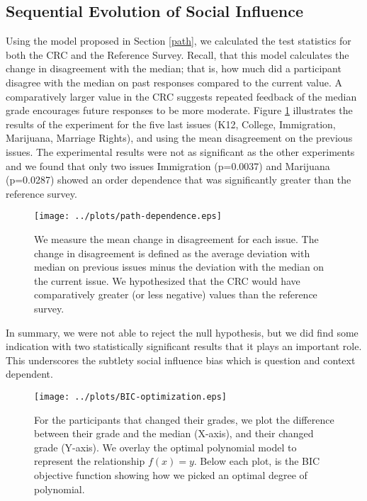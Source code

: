 \subsection{Sequential Evolution of Social Influence}
Using the model proposed in Section \ref{path}, we calculated the test statistics for both the CRC and the Reference Survey.
Recall, that this model calculates the change in disagreement with the median; that is, how much did a participant disagree with the median on past responses compared 
to the current value.
A comparatively larger value in the CRC suggests repeated feedback of the median grade encourages future responses to be more moderate.
Figure \ref{path-1} illustrates the results of the experiment for the five last issues (K12, College, Immigration, Marijuana, Marriage Rights), and using the mean disagreement on the previous issues.
The experimental results were not as significant as the other experiments and we found that only two issues Immigration (p=0.0037) and Marijuana (p=0.0287) showed an order dependence that was significantly greater than the reference survey.

\begin{figure}[h]
	\hspace{-2em}
    \texttt{[image: ../plots/path-dependence.eps]}
      \caption{We measure the mean change in disagreement for each issue. The change in disagreement is defined as the average deviation with median on previous issues minus the deviation with the median on the current issue. We hypothesized that the CRC would have comparatively greater (or less negative) values than the reference survey.}
      \label{path-1}
\end{figure}
In summary, we were not able to reject the null hypothesis, but we did find some indication with two statistically significant results that it plays an important role.
This underscores the subtlety social influence bias which is question and context dependent.

\begin{figure*}[ht!]
\hspace{-7em}
    \texttt{[image: ../plots/BIC-optimization.eps]}
      \caption{For the participants that changed their grades, we plot the difference between their grade and the median (X-axis), and their changed grade (Y-axis). We overlay the optimal polynomial model to represent the relationship $f(x) = y$. Below each plot, is the BIC objective function showing how we picked an optimal degree of polynomial.}
      \label{opt-1}
\end{figure*}
